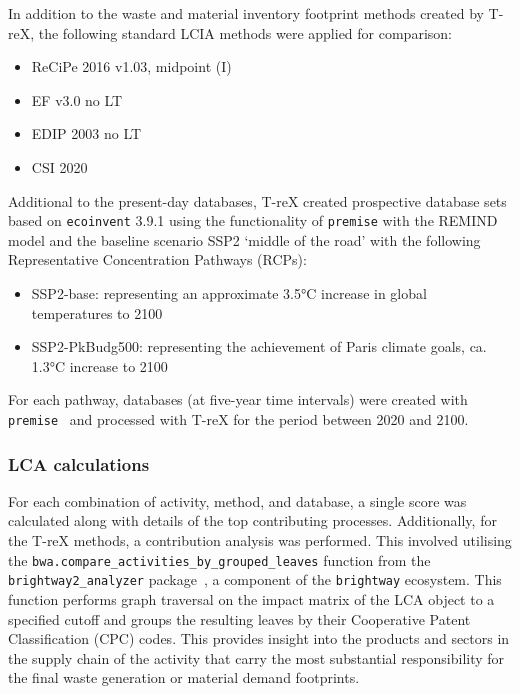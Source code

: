 In addition to the waste and material inventory footprint methods created by T-reX, the following standard LCIA methods were applied for comparison:

\begin{itemize}[itemsep=0pt]
    \item ReCiPe 2016 v1.03, midpoint (I)~\citep{huijbregts2016recipe}
    \item EF v3.0 no LT~\citep{eu2023ef}
    \item EDIP 2003 no LT~\citep{hauschild2003edip}
    \item CSI 2020~\citep{arvidsson2020csi}
\end{itemize}

Additional to the present-day databases, T-reX created prospective database sets based on \texttt{ecoinvent} 3.9.1 using the functionality of \texttt{premise} with the REMIND model and the baseline scenario SSP2 `middle of the road' with the following Representative Concentration Pathways (RCPs):
\begin{itemize}
    \item SSP2-base: representing an approximate 3.5°C increase in global temperatures to 2100
    \item SSP2-PkBudg500: representing the achievement of Paris climate goals, ca. 1.3°C increase to 2100
\end{itemize}

For each pathway, databases (at five-year time intervals) were created with \texttt{premise}~\citep{sacchi2022premise} and processed with T-reX for the period between 2020 and 2100.

\subsubsection{LCA calculations}
For each combination of activity, method, and database, a single score was calculated along with details of the top contributing processes. Additionally, for the T-reX methods, a contribution analysis was performed. This involved utilising the \texttt{bwa.compare\_activities\_by\_grouped\_leaves} function from the \texttt{brightway2\_analyzer} package~\citep{mutel2016brightway2analyzer}, a component of the \texttt{brightway} ecosystem. This function performs graph traversal on the impact matrix of the LCA object to a specified cutoff and groups the resulting leaves by their Cooperative Patent Classification (CPC) codes. This provides insight into the products and sectors in the supply chain of the activity that carry the most substantial responsibility for the final waste generation or material demand footprints.


